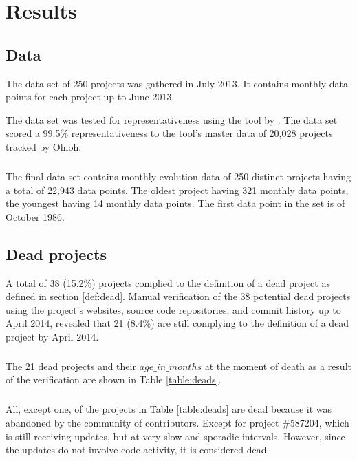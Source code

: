 \chapter{Results}
\label{results}

\section{Data}
The data set of 250 projects was gathered in July 2013. It contains monthly
data points for each project up to June 2013.

The data set was tested for representativeness using the tool by
\citet{nagappan}. The data set scored a 99.5\% representativeness to the tool's
master data of 20,028 projects tracked by Ohloh.

\paragraph{}
The final data set contains monthly evolution data of 250 distinct projects
having a total of 22,943 data points. The oldest project having 321 monthly
data points, the youngest having 14 monthly data points. The first data point
in the set is of October 1986.

\section{Dead projects}
\label{section:deads}
A total of 38 (15.2\%) projects complied to the definition of a dead project as
defined in section \ref{def:dead}. Manual verification of the 38 potential
dead projects using the project's websites, source code repositories, and
commit history up to April 2014, revealed that 21 (8.4\%) are still complying
to the definition of a dead project by April 2014.

\paragraph{}
The 21 dead projects and their $age\_in\_months$ at the moment of death as a
result of the verification are shown in Table \ref{table:deads}.



\paragraph{}
All, except one, of the projects in Table \ref{table:deads} are dead because it
was abandoned by the community of contributors. Except for project \#587204,
which is still receiving updates, but at very slow and sporadic intervals.
However, since the updates do not involve code activity, it is considered dead.

